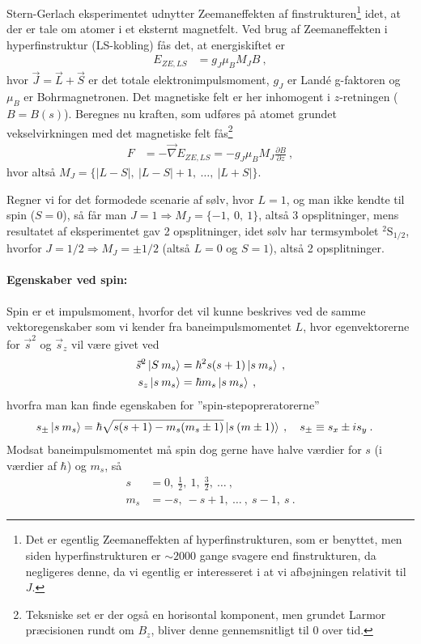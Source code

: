 Stern-Gerlach eksperimentet udnytter Zeemaneffekten af finstrukturen\footnote{Det er egentlig Zeemaneffekten af hyperfinstrukturen, som er benyttet, men siden hyperfinstrukturen er $\sim 2000$ gange svagere end finstrukturen, da negligeres denne, da vi egentlig er interesseret i at vi afbøjningen relativit til $J$.} idet, at der er tale om atomer i et eksternt magnetfelt. Ved brug af Zeemaneffekten i hyperfinstruktur (LS-kobling) fås det, at energiskiftet er
\begin{align}
    E_{ZE,LS} &= g_J \mu_B M_J B \: ,
\end{align}
hvor $\Vec{J} = \Vec{L} + \Vec{S}$ er det totale elektronimpulsmoment, $g_J$ er Landé g-faktoren og $\mu_B$ er Bohrmagnetronen. Det magnetiske felt er her inhomogent i $z$-retningen ($B = B(s)$). Beregnes nu kraften, som udføres på atomet grundet vekselvirkningen med det magnetiske felt fås\footnote{Teksniske set er der også en horisontal komponent, men grundet Larmor præcisionen rundt om $B_z$, bliver denne gennemsnitligt til 0 over tid.}
\begin{align} \label{eq:Q08_KraftenISternGerlach}
    F &= -\Vec{\nabla}E_{ZE,LS} = - g_J \mu_B M_J \frac{\partial B}{\partial z} \: ,
\end{align}
hvor altså $M_J = \{|L-S|,\: |L-S|+1,\: \ldots ,\: |L+S|\}$.

Regner vi for det formodede scenarie af sølv, hvor $L = 1$, og man ikke kendte til spin ($S=0$), så får man $J = 1 \Rightarrow M_J = \{-1,\: 0,\: 1\}$, altså 3 opsplitninger, mens resultatet af eksperimentet gav 2 opsplitninger, idet sølv har termsymbolet ${}^2\text{S}_{1/2}$, hvorfor $J = 1/2 \Rightarrow M_J = \pm 1/2$ (altså $L = 0$ og $S = 1$), altså 2 opsplitninger.


\paragraph{Egenskaber ved spin:} Spin er et impulsmoment, hvorfor det vil kunne beskrives ved de samme vektoregenskaber som vi kender fra baneimpulsmomentet $L$, hvor egenvektorerne for $\Vec{s}^2$ og $\Vec{s}_z$ vil være givet ved
\begin{align}
    \Vec{s}^2\ket{S \: m_s} &= \hbar^2 s(s+1) \ket{s \: m_s} \label{eq:Q08_EgenvektorligningForS^2} \: , \\
    s_z\ket{s \: m_s} &= \hbar m_s \ket{s \: m_s} \: , \label{eq:Q08_EgenvektorligningForS_z}
\end{align}
hvorfra man kan finde egenskaben for ''spin-stepopreratorerne''
\begin{align}
    s_\pm \ket{s \: m_s} &= \hbar \sqrt{s(s+1) - m_s(m_s \pm 1)} \ket{s \: (m \pm 1)} \: , \quad s_\pm \equiv s_x \pm i s_y \: .
\end{align}
\noindent
Modsat baneimpulsmomentet må spin dog gerne have halve værdier for $s$ (i værdier af $\hbar$) og $m_s$, så
\begin{align}
    s &= 0, \: \frac{1}{2}, \: 1, \: \frac{3}{2}, \: \ldots \: , \\
    m_s &= -s, \: -s + 1, \: \ldots \: , \: s - 1, \: s \: .
\end{align}

